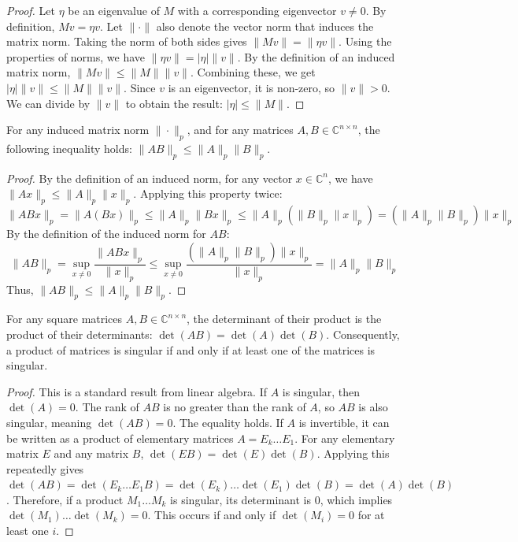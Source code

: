 \begin{proof}
    Let $\eta$ be an eigenvalue of $M$ with a corresponding eigenvector $v \neq 0$. By definition, $Mv = \eta v$.
    Let $\|\cdot\|$ also denote the vector norm that induces the matrix norm. Taking the norm of both sides gives $\|Mv\| = \|\eta v\|$.
    Using the properties of norms, we have $\|\eta v\| = |\eta| \|v\|$. By the definition of an induced matrix norm, $\|Mv\| \le \|M\| \|v\|$.
    Combining these, we get $|\eta| \|v\| \le \|M\| \|v\|$. Since $v$ is an eigenvector, it is non-zero, so $\|v\| > 0$. We can divide by $\|v\|$ to obtain the result: $|\eta| \le \|M\|$.
\end{proof}

\begin{lemma}
    \label{lem:Sub_Multiplicativity_of_Matrix_Norms}
    For any induced matrix norm $\|\cdot\|_p$, and for any matrices $A, B \in \mathbb{C}^{n \times n}$, the following inequality holds: $\|AB\|_p \le \|A\|_p \|B\|_p$.
\end{lemma}

\begin{proof}
    By the definition of an induced norm, for any vector $x \in \mathbb{C}^n$, we have $\|Ax\|_p \le \|A\|_p \|x\|_p$.
    Applying this property twice:
    \[ \|ABx\|_p = \|A(Bx)\|_p \le \|A\|_p \|Bx\|_p \le \|A\|_p (\|B\|_p \|x\|_p) = (\|A\|_p \|B\|_p) \|x\|_p \]
    By the definition of the induced norm for $AB$:
    \[ \|AB\|_p = \sup_{x \neq 0} \frac{\|ABx\|_p}{\|x\|_p} \le \sup_{x \neq 0} \frac{(\|A\|_p \|B\|_p) \|x\|_p}{\|x\|_p} = \|A\|_p \|B\|_p \]
    Thus, $\|AB\|_p \le \|A\|_p \|B\|_p$.
\end{proof}

\begin{lemma}
    \label{lem:Determinant_of_Product}
    For any square matrices $A, B \in \mathbb{C}^{n \times n}$, the determinant of their product is the product of their determinants: $\det(AB) = \det(A)\det(B)$. Consequently, a product of matrices is singular if and only if at least one of the matrices is singular.
\end{lemma}

\begin{proof}
    This is a standard result from linear algebra. If $A$ is singular, then $\det(A) = 0$. The rank of $AB$ is no greater than the rank of $A$, so $AB$ is also singular, meaning $\det(AB) = 0$. The equality holds.
    If $A$ is invertible, it can be written as a product of elementary matrices $A = E_k \dots E_1$. For any elementary matrix $E$ and any matrix $B$, $\det(EB) = \det(E)\det(B)$. Applying this repeatedly gives $\det(AB) = \det(E_k \dots E_1 B) = \det(E_k) \dots \det(E_1) \det(B) = \det(A) \det(B)$.
    Therefore, if a product $M_1 \dots M_k$ is singular, its determinant is 0, which implies $\det(M_1)\dots\det(M_k)=0$. This occurs if and only if $\det(M_i)=0$ for at least one $i$.
\end{proof}

